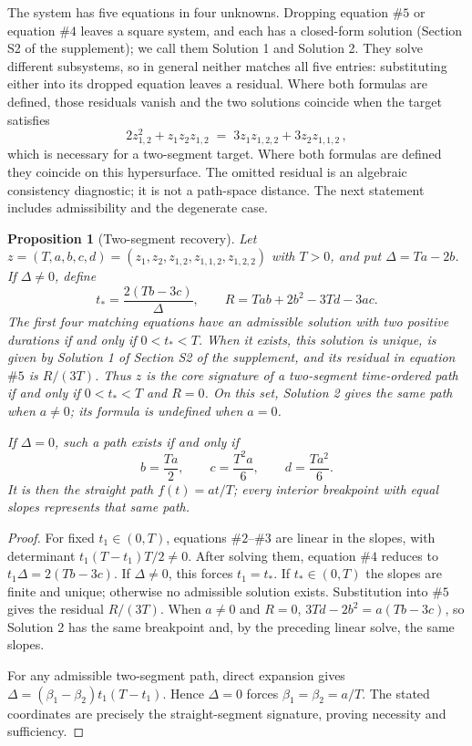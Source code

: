 \documentclass[11pt,english]{article}
\newtheorem{proposition}[theorem]{Proposition}
\theoremstyle{definition}
\theoremstyle{remark}
\begin{document}
The system has five equations in four unknowns. Dropping equation
$\#5$ or equation $\#4$ leaves a square system, and each has a closed-form
solution (Section S2 of the supplement); we call them Solution 1 and
Solution 2. They solve different subsystems, so in general neither
matches all five entries: substituting either into its dropped equation
leaves a residual. Where both formulas are defined, those residuals
vanish and the two solutions coincide when the target satisfies
\begin{equation}
2z_{1,2}^{2}+z_{1}z_{2}z_{1,2}\;=\;3z_{1}z_{1,2,2}+3z_{2}z_{1,1,2}\,,\label{eq:Consistency2P}
\end{equation}
which is necessary for a two-segment target. Where both formulas are
defined they coincide on this hypersurface. The omitted residual is an
algebraic consistency diagnostic; it is not a path-space distance.
The next statement includes admissibility and the degenerate case.


\begin{proposition}[Two-segment recovery]
\label{prop:twopiece}
Let $z=(T,a,b,c,d)=(z_1,z_2,z_{1,2},z_{1,1,2},z_{1,2,2})$ with
$T>0$, and put $\Delta=Ta-2b$. If $\Delta\ne0$, define
\[
t_* = \frac{2(Tb-3c)}{\Delta},\qquad
R=Tab+2b^2-3Td-3ac.
\]
The first four matching equations have an admissible solution with
two positive durations if and only if $0<t_*<T$. When it exists,
this solution is unique, is given by Solution 1 of Section S2 of the supplement, and
its residual in equation $\#5$ is $R/(3T)$. Thus $z$ is the core
signature of a two-segment time-ordered path if and only if
$0<t_*<T$ and $R=0$. On this set, Solution 2 gives the same path
when $a\ne0$; its formula is undefined when $a=0$.

If $\Delta=0$, such a path exists if and only if
\[
b=\frac{Ta}{2},\qquad c=\frac{T^2a}{6},\qquad d=\frac{Ta^2}{6}.
\]
It is then the straight path $f(t)=at/T$; every interior breakpoint
with equal slopes represents that same path.
\end{proposition}

\begin{proof}
For fixed $t_1\in(0,T)$, equations $\#2$--$\#3$ are linear in the
slopes, with determinant $t_1(T-t_1)T/2\ne0$. After solving them,
equation $\#4$ reduces to $t_1\Delta=2(Tb-3c)$. If $\Delta\ne0$,
this forces $t_1=t_*$. If $t_*\in(0,T)$ the slopes are finite and
unique; otherwise no admissible solution exists. Substitution into
$\#5$ gives the residual $R/(3T)$. When $a\ne0$ and $R=0$,
$3Td-2b^2=a(Tb-3c)$, so Solution 2 has the same breakpoint and,
by the preceding linear solve, the same slopes.

For any admissible two-segment path, direct expansion gives
$\Delta=(\beta_1-\beta_2)t_1(T-t_1)$. Hence $\Delta=0$ forces
$\beta_1=\beta_2=a/T$. The stated coordinates are precisely the
straight-segment signature, proving necessity and sufficiency.
\end{proof}
\end{document}
